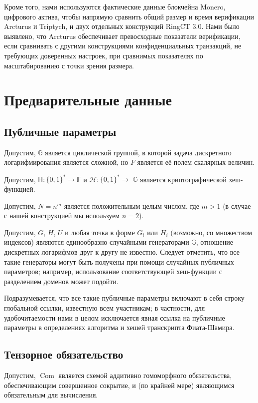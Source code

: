 \documentclass{article}
\newcommand{\F}{\mathbb{F}}
\newcommand{\hs}{\mathsf{H}}
\newcommand{\hp}{\mathcal{H}}
\newcommand{\com}{\operatorname{Com}}
\theoremstyle{definition}
\begin{document}
Кроме того, нами используются фактические данные блокчейна Monero, цифрового актива, чтобы напрямую сравнить общий размер и время верификации Arcturus и Triptych, и двух отдельных конструкций RingCT 3.0. Нами было выявлено, что Arcturus обеспечивает превосходные показатели верификации, если сравнивать с другими конструкциями конфиденциальных транзакций, не требующих доверенных настроек, при сравнимых показателях по масштабированию с точки зрения размера.


\section{Предварительные данные}

\subsection{Публичные параметры}
Допустим, \begin{math}\mathbb{G}\end{math} является циклической группой, в которой задача дискретного логарифмирования является сложной, но $F$ является её полем скалярных величин.

Допустим, $\hs: \{0,1\}^* \to \F$ и $\hp: \{0,1\}^* \to$ \begin{math}\mathbb{G}\end{math} является криптографической хеш-функцией.

Допустим, $N = n^m$ является положительным целым числом, где $m > 1$ (в случае с нашей конструкцией мы используем $n = 2$).

Допустим, $G$, $H$, $U$ и любая точка в форме $G_i$ или $H_i$ (возможно, со множеством индексов) являются единообразно случайными генераторами \begin{math}\mathbb{G}\end{math}, отношение дискретных логарифмов друг к другу не известно. Следует отметить, что все такие генераторы могут быть получены при помощи случайных публичных параметров; например, использование соответствующей хеш-функции с разделением доменов может подойти.

Подразумевается, что все такие публичные параметры включают в себя строку глобальной ссылки, известную всем участникам; в частности, для удобочитаемости нами в целом исключается явная ссылка на публичные параметры в определениях алгоритма и хешей транскрипта Фиата-Шамира.


\subsection{Тензорное обязательство}
Допустим, $\com$ является схемой аддитивно гомоморфного обязательства, обеспечивающим совершенное сокрытие, и (по крайней мере) являющимся обязательным для вычисления.
\end{document}
